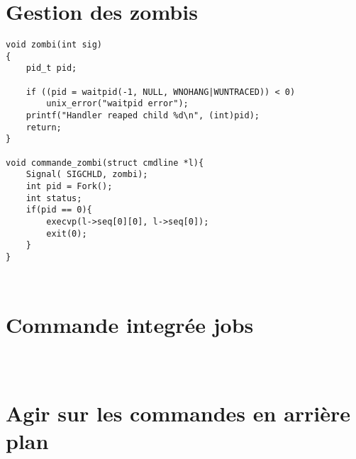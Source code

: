 \documentclass{report}
\begin{document}
		\section{Gestion des zombis}
			\begin{lstlisting}
void zombi(int sig)
{
    pid_t pid;

    if ((pid = waitpid(-1, NULL, WNOHANG|WUNTRACED)) < 0)
        unix_error("waitpid error");
    printf("Handler reaped child %d\n", (int)pid);
    return;
}

void commande_zombi(struct cmdline *l){
	Signal( SIGCHLD, zombi);
	int pid = Fork();
	int status;
	if(pid == 0){
		execvp(l->seq[0][0], l->seq[0]);
		exit(0);
	}
}
			\end{lstlisting}
			\begin{lstlisting}[frame=single,basicstyle=\footnotesize,language=bash]
			\end{lstlisting}
			\begin{lstlisting}[frame=single,basicstyle=\footnotesize,language=bash]
			\end{lstlisting}
		\section{Commande integr\'ee jobs}
			\begin{lstlisting}
			\end{lstlisting}
			\begin{lstlisting}[frame=single,basicstyle=\footnotesize,language=bash]
			\end{lstlisting}
			\begin{lstlisting}[frame=single,basicstyle=\footnotesize,language=bash]
			\end{lstlisting}
		\section{Agir sur les commandes en arri\`ere plan}
			\begin{lstlisting}
			\end{lstlisting}
			\begin{lstlisting}[frame=single,basicstyle=\footnotesize,language=bash]
			\end{lstlisting}
			\begin{lstlisting}[frame=single,basicstyle=\footnotesize,language=bash]
			\end{lstlisting}
\end{document}
